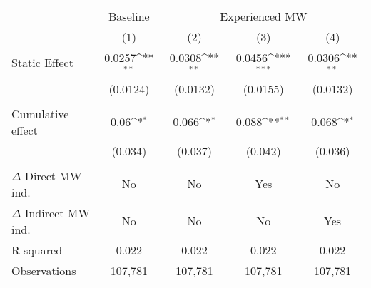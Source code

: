 {
\def\sym#1{\ifmmode^{#1}\else\(^{#1}\)\fi}
\begin{tabular}{l*{4}{c}}
\hline\hline
          &\multicolumn{1}{c}{Baseline}&\multicolumn{3}{c}{Experienced MW}                      \\\cmidrule(lr){2-2}\cmidrule(lr){3-5}
          &\multicolumn{1}{c}{(1)}         &\multicolumn{1}{c}{(2)}         &\multicolumn{1}{c}{(3)}         &\multicolumn{1}{c}{(4)}         \\
\hline
Static Effect&   0.0257\sym{**} &   0.0308\sym{**} &   0.0456\sym{***}&   0.0306\sym{**} \\
          & (0.0124)         & (0.0132)         & (0.0155)         & (0.0132)         \\
\hline
\vspace{-1mm}&                  &                  &                  &                  \\
Cumulative effect&0.06\sym{*}         &0.066\sym{*}         &0.088\sym{**}         &0.068\sym{*}         \\
          &  (0.034)         &  (0.037)         &  (0.042)         &  (0.036)         \\
\hline    &                  &                  &                  &                  \\
$\Delta$ Direct MW ind.&       No         &       No         &      Yes         &       No         \\
$\Delta$ Indirect MW ind.&       No         &       No         &       No         &      Yes         \\
R-squared &    0.022         &    0.022         &    0.022         &    0.022         \\
Observations&  107,781         &  107,781         &  107,781         &  107,781         \\
\hline\hline
\end{tabular}
}
